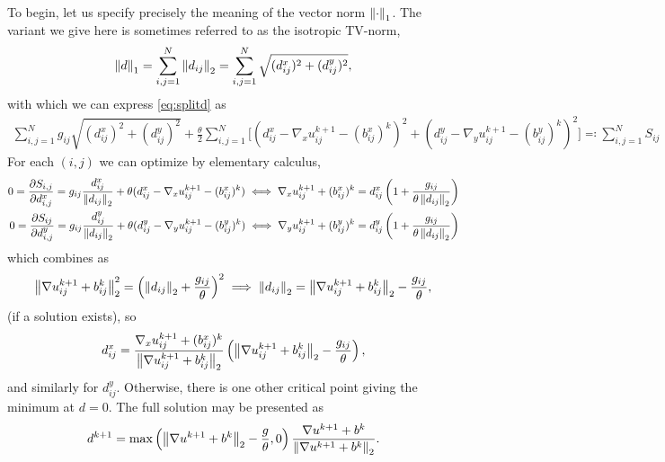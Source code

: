 To begin, let us specify precisely the meaning of the vector norm $\left\lVert\cdot \right\rVert_1$. The variant we give here is sometimes referred to as the isotropic TV-norm,
\begin{align*}
\left\lVert d \right\rVert_1
= \sum^N_{i,j = 1}  \left\lVert d_{ij}\right\rVert_2 
= \sum^{N}_{i,j = 1} \sqrt{ (d^x_{ij} )^2 + (d^y_{ij} )^2 },
\end{align*}
with which we can express \eqref{eq:splitd} as
\begin{align*}
\sum^{N}_{i,j = 1} g_{ij} \sqrt{ (d^x_{ij} )^2 + (d^y_{ij} )^2 }
+ \frac{\theta}{2} \sum^N_{i,j=1} \big[ (d^x_{ij} - \nabla_x u^{k+1}_{ij} - (b^x_{ij})^k)^2 
+ (d^y_{ij} - \nabla_y u^{k+1}_{ij} - (b^y_{ij})^k)^2 
\big]
\eqqcolon \sum^N_{i,j=1} S_{ij}
\end{align*}
For each $(i,j)$ we can optimize by elementary calculus, 
\begin{align*}
0
=\frac{\partial S_{i,j}}{\partial d^x_{i,j}} 
= g_{ij}\frac{d^x_{ij}}{ \left\lVert d_{ij}\right\rVert_2}
+ \theta (d^x_{ij} - \nabla_x u^{k+1}_{ij} - (b^x_{ij})^k) 
\iff
\nabla_x u^{k+1}_{ij} + (b^x_{ij})^k  
= d^x_{ij} \left( 1 + \frac{g_{ij}}{\theta \left\lVert d_{ij}\right\rVert_2}
\right)
\\
0
=\frac{\partial S_{ij}}{\partial d^y_{i,j}} 
= g_{ij}\frac{d^y_{ij}}{ \left\lVert d_{ij}\right\rVert_2}
+ \theta (d^y_{ij} - \nabla_y u^{k+1}_{ij} - (b^y_{ij})^k) 
\iff
\nabla_y u^{k+1}_{ij} + (b^y_{ij})^k 
= d^y_{ij} \left( 1 + \frac{g_{ij}}{\theta\left\lVert d_{ij}\right\rVert_2}
\right)
\end{align*}
which combines as 
\begin{align*}
\left\lVert\nabla u^{k+1}_{ij} + b^k_{ij}\right\rVert_2^2 = \left(\left\lVert d_{ij}\right\rVert_2 + \frac{g_{ij}}{\theta}
\right)^2
\implies 
\left\lVert d_{ij}\right\rVert_2 = \left\lVert\nabla u^{k+1}_{ij} + b^k_{ij} \right\rVert_2 - \frac{g_{ij}}{\theta},
\end{align*}
(if a solution exists), so
\begin{align*}
d_{ij}^x 
= \frac{ \nabla_x u^{k+1}_{ij} + (b^x_{ij})^k }{ \left\lVert\nabla u^{k+1}_{ij} + b^k_{ij} \right\rVert_2} \left( \left\lVert\nabla u^{k+1}_{ij} + b^k_{ij} \right\rVert_2 - \frac{g_{ij}}{\theta} \right), 
\end{align*}
and similarly for $d^y_{ij}$. Otherwise, there is one other critical point giving the minimum at $d = 0$. The full solution may be presented as
\begin{align}
d^{k+1}
= \max\left( \left\lVert \nabla u^{k+1} + b^k\right\rVert_2 - \frac{g}{\theta}, 0 \right) \frac{ \nabla u^{k+1} + b^k}{ \left\lVert \nabla u^{k+1} + b^k\right\rVert_2}.
\label{eq:sbdij}
\end{align}


